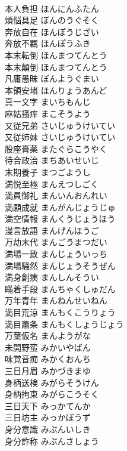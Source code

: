\documentclass[8pt]{extreport}
\begin{document}
\begin{CJK}{UTF8}{min}
\\	本人負担	ほんにんふたん	
\\	煩悩具足	ぼんのうぐそく	
\\	奔放自在	ほんぽうじざい	
\\	奔放不羈	ほんぽうふき	
\\	本末転倒	ほんまつてんとう	
\\	本末顛倒	ほんまつてんとう	
\\	凡庸愚昧	ぼんようぐまい	
\\	本領安堵	ほんりょうあんど	
\\	真一文字	まいちもんじ	
\\	麻姑掻痒	まこそうよう	
\\	又従兄弟	さいじゅうけいてい	
\\	又従姉妹	さいじゅうけいてい	
\\	股座膏薬	またぐらこうやく	
\\	待合政治	まちあいせいじ	
\\	末期養子	まつごようし	
\\	満悦至極	まんえつしごく	
\\	満員御礼	まんいんおんれい	
\\	満願成就	まんがんじょうじゅ	
\\	満空情報	まんくうじょうほう	
\\	漫言放語	まんげんほうご	
\\	万劫末代	まんごうまつだい	
\\	満場一致	まんじょういっち	
\\	満場騒然	まんじょうそうぜん	
\\	満身創痍	まんしんそうい	
\\	瞞着手段	まんちゃくしゅだん	
\\	万年青年	まんねんせいねん	
\\	満目荒涼	まんもくこうりょう	
\\	満目蕭条	まんもくしょうじょう	
\\	万葉仮名	まんようがな	
\\	未開野蛮	みかいやばん	
\\	味覚音痴	みかくおんち	
\\	三日月眉	みかづきまゆ	
\\	身柄送検	みがらそうけん	
\\	身柄拘束	みがらこうそく	
\\	三日天下	みっかてんか	
\\	三日坊主	みっかぼうず	
\\	身分意識	みぶんいしき	
\\	身分詐称	みぶんさしょう	

\end{CJK}
\end{document}

